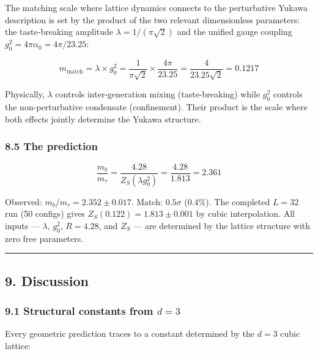 \documentclass[
  11pt,
]{article}
\begin{document}
The matching scale where lattice dynamics connects to the perturbative
Yukawa description is set by the product of the two relevant
dimensionless parameters: the taste-breaking amplitude
\(\lambda = 1/(\pi\sqrt{2})\) and the unified gauge coupling
\(g_0^2 = 4\pi\alpha_0 = 4\pi/23.25\):

\[m_{\text{match}} = \lambda \times g_0^2 = \frac{1}{\pi\sqrt{2}} \times \frac{4\pi}{23.25} = \frac{4}{23.25\sqrt{2}} = 0.1217\]

Physically, \(\lambda\) controls inter-generation mixing
(taste-breaking) while \(g_0^2\) controls the non-perturbative
condensate (confinement). Their product is the scale where both effects
jointly determine the Yukawa structure.

\hypertarget{the-prediction}{%
\subsubsection{8.5 The prediction}\label{the-prediction}}

\[\boxed{\frac{m_b}{m_\tau} = \frac{4.28}{Z_S(\lambda g_0^2)} = \frac{4.28}{1.813} = 2.361}\]

Observed: \(m_b/m_\tau = 2.352 \pm 0.017\). Match: \(0.5\sigma\)
(\(0.4\%\)). The completed \(L = 32\) run (50 configs) gives
\(Z_S(0.122) = 1.813 \pm 0.001\) by cubic interpolation. All inputs ---
\(\lambda\), \(g_0^2\), \(R = 4.28\), and \(Z_S\) --- are determined by
the lattice structure with zero free parameters.

\begin{center}\rule{0.5\linewidth}{0.5pt}\end{center}

\hypertarget{discussion}{%
\subsection{9. Discussion}\label{discussion}}

\hypertarget{structural-constants-from-d-3}{%
\subsubsection{\texorpdfstring{9.1 Structural constants from
\(d = 3\)}{9.1 Structural constants from d = 3}}\label{structural-constants-from-d-3}}

Every geometric prediction traces to a constant determined by the
\(d = 3\) cubic lattice:
\end{document}
